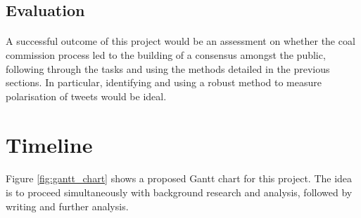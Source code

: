 \documentclass[10pt,twocolumn,letterpaper]{article}
\begin{document}
\subsection{Evaluation}

\paragraph{} A successful outcome of this project would be an assessment on whether the coal commission process led to the building of a consensus amongst the public, following through the tasks and using the methods detailed in the previous sections. In particular, identifying and using a robust method to measure polarisation of tweets would be ideal.  

\section{Timeline}


\paragraph{} Figure \ref{fig:gantt_chart} shows a proposed Gantt chart for this project. The idea is to proceed simultaneously with background research and analysis, followed by writing and further analysis. 



{\small


}
\end{document}
